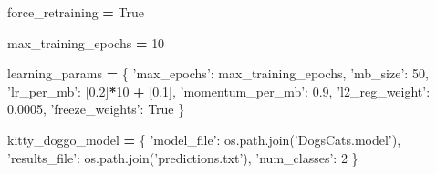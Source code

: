 \documentclass[]{book}
\newenvironment{Shaded}{\begin{snugshade}}{\end{snugshade}}
\newcommand{\DecValTok}[1]{\textcolor[rgb]{0.00,0.00,0.81}{#1}}
\newcommand{\FloatTok}[1]{\textcolor[rgb]{0.00,0.00,0.81}{#1}}
\newcommand{\SpecialCharTok}[1]{\textcolor[rgb]{0.00,0.00,0.00}{#1}}
\newcommand{\StringTok}[1]{\textcolor[rgb]{0.31,0.60,0.02}{#1}}
\newcommand{\VariableTok}[1]{\textcolor[rgb]{0.00,0.00,0.00}{#1}}
\newcommand{\ControlFlowTok}[1]{\textcolor[rgb]{0.13,0.29,0.53}{\textbf{#1}}}
\newcommand{\OperatorTok}[1]{\textcolor[rgb]{0.81,0.36,0.00}{\textbf{#1}}}
\newcommand{\BuiltInTok}[1]{#1}
\newcommand{\NormalTok}[1]{#1}
\theoremstyle{definition}
\theoremstyle{definition}
\theoremstyle{definition}
\theoremstyle{remark}
\begin{document}
\begin{Shaded}
\begin{Highlighting}[]
\NormalTok{force_retraining }\OperatorTok{=} \VariableTok{True}

\NormalTok{max_training_epochs }\OperatorTok{=} \DecValTok{10}

\NormalTok{learning_params }\OperatorTok{=}\NormalTok{ \{}
    \StringTok{'max_epochs'}\NormalTok{: max_training_epochs,}
    \StringTok{'mb_size'}\NormalTok{: }\DecValTok{50}\NormalTok{,}
    \StringTok{'lr_per_mb'}\NormalTok{: [}\FloatTok{0.2}\NormalTok{]}\OperatorTok{*}\DecValTok{10} \OperatorTok{+}\NormalTok{ [}\FloatTok{0.1}\NormalTok{],}
    \StringTok{'momentum_per_mb'}\NormalTok{: }\FloatTok{0.9}\NormalTok{,}
    \StringTok{'l2_reg_weight'}\NormalTok{: }\FloatTok{0.0005}\NormalTok{,}
    \StringTok{'freeze_weights'}\NormalTok{: }\VariableTok{True}
\NormalTok{\}}
\end{Highlighting}
\end{Shaded}

\begin{Shaded}
\begin{Highlighting}[]
\NormalTok{kitty_doggo_model }\OperatorTok{=}\NormalTok{ \{}
    \StringTok{'model_file'}\NormalTok{: os.path.join(}\StringTok{'DogsCats.model'}\NormalTok{),}
    \StringTok{'results_file'}\NormalTok{: os.path.join(}\StringTok{'predictions.txt'}\NormalTok{),}
    \StringTok{'num_classes'}\NormalTok{: }\DecValTok{2}
\NormalTok{\}}
\end{Highlighting}
\end{Shaded}

\begin{Shaded}
\end{Shaded}
\end{document}

